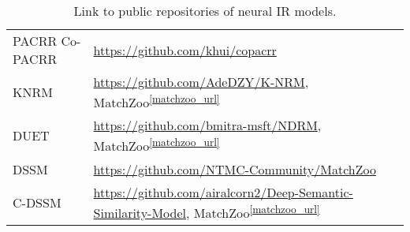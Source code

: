 \begin{table}[h]
\begin{minipage}{\textwidth}
\begin{tabular}{L{10em}L{30em}}
        PACRR \newline Co-PACRR & \url{https://github.com/khui/copacrr}\\
        \addlinespace[0.3em]
        
        KNRM & \url{https://github.com/AdeDZY/K-NRM}, MatchZoo\textsuperscript{\ref{matchzoo_url}}\\
        \addlinespace[0.3em]
        
        DUET & \url{https://github.com/bmitra-msft/NDRM}, MatchZoo\textsuperscript{\ref{matchzoo_url}}\\
        \addlinespace[0.3em]
        
        DSSM & \url{https://github.com/NTMC-Community/MatchZoo}\\
        \addlinespace[0.3em]
        
        C-DSSM & \url{https://github.com/airalcorn2/Deep-Semantic-Similarity-Model}, MatchZoo\textsuperscript{\ref{matchzoo_url}}\\
        \bottomrule
    \end{tabular}
    \end{minipage}
    \caption{Link to public repositories of neural IR models.}
    \label{tab:neural_ir_repo}
\end{table}